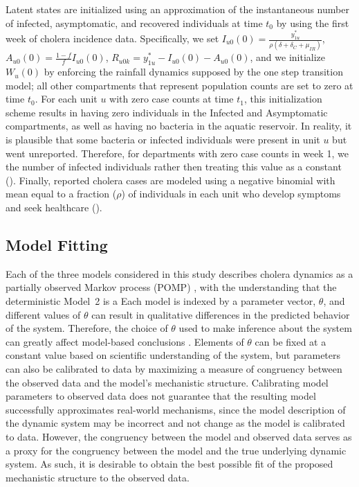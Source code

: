 \documentclass[10pt,letterpaper]{article}\usepackage[]{graphicx}\usepackage[table]{xcolor}
\newcommand\muIR{\mu_{IR}}
\newcommand\muDeath{\delta}
\newcommand\choleraDeath{\delta_{C}}
\newcommand\symptomFrac{f}
\newcommand\reportRate{\rho}
\newcommand\obsOverdispersion{\psi}
\newcommand\paramVec{\theta}
\begin{document}
Latent states are initialized using an approximation of the instantaneous number of infected, asymptomatic, and recovered individuals at time $t_0$ by using the first week of cholera incidence data.
Specifically, we set $I_{u0}(0) = \frac{y^*_{1u}}{\reportRate(\muDeath + \choleraDeath + \muIR)}$, $A_{u0}(0) = \frac{1 - \symptomFrac}{\symptomFrac}I_{u0}(0)$, $R_{u0k} = y^*_{1u} - I_{u0}(0) - A_{u0}(0)$, and we initialize $W_{u}(0)$ by enforcing the rainfall dynamics supposed by the one step transition model;
all other compartments that represent population counts are set to zero at time $t_0$.
For each unit $u$ with zero case counts at time $t_1$, this initialization scheme results in having zero individuals in the Infected and Asymptomatic compartments, as well as having no bacteria in the aquatic reservoir.
In reality, it is plausible that some bacteria or infected individuals were present in unit $u$ but went unreported.
Therefore, for departments with zero case counts in week 1, we  the number of infected individuals rather then treating this value as a constant ().
Finally, reported cholera cases are modeled using a negative binomial   with mean equal to a fraction ($\reportRate$) of individuals in each unit who develop symptoms and seek healthcare\new{, and with over-dispersion parameter $\obsOverdispersion$} ().

\subsection*{Model Fitting}\label{sec:model_fitting}

Each of the three models considered in this study describes cholera dynamics as a partially observed Markov process (POMP) \cite{king16}, with the understanding that the deterministic Model~2 is a  
Each model is indexed by a parameter vector, $\paramVec$, and different values of $\paramVec$ can result in qualitative differences in the predicted behavior of the system.
Therefore, the choice of $\paramVec$ used to make inference about the system can greatly affect model-based conclusions  .
Elements of $\paramVec$ can be fixed at a constant value based on scientific understanding of the system, but parameters can also be calibrated to data by maximizing a measure of congruency between the observed data and the model's mechanistic structure.
Calibrating model parameters to observed data does not guarantee that the resulting model successfully approximates real-world mechanisms, since the model description of the dynamic system may be incorrect and   not change as the model is calibrated to data.
However, the congruency between the model and observed data serves as a proxy for the congruency between the model and the true underlying dynamic system.
As such, it is desirable to obtain the best possible fit of the proposed mechanistic structure to the observed data.
\end{document}
